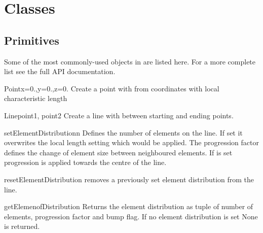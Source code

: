 \section{\pycad Classes}

\subsection{Primitives}

Some of the most commonly-used objects in \pycad are listed here. For a more complete
list see the full API documentation.

\begin{classdesc}{Point}{x=0.,y=0.,z=0.}
Create a point with from coordinates with local characteristic length 
\end{classdesc}

\begin{classdesc}{Line}{point1, point2}
Create a line with between starting and ending points.
\end{classdesc}
\begin{methoddesc}[Line]{setElementDistribution}{n}
Defines the number of elements on the line. If set it overwrites the local length setting which would be applied. The progression factor  defines the change of element size between neighboured elements. If  is set
progression is applied towards the centre of the line.
\end{methoddesc}
\begin{methoddesc}[Line]{resetElementDistribution}{}
removes a previously set element distribution from the line.
\end{methoddesc}
\begin{methoddesc}[Line]{getElemenofDistribution}{}
Returns the element distribution as tuple of
number of elements, progression factor and bump flag. If
no element distribution is set None is returned.
\end{methoddesc}



